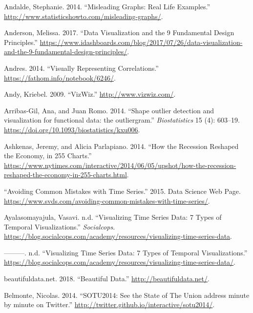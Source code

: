 \documentclass[]{book}
\begin{document}
\leavevmode\hypertarget{ref-andale_2014}{}%
Andalde, Stephanie. 2014. ``Misleading Graphs: Real Life Examples.'' \url{http://www.statisticshowto.com/misleading-graphs/}.

\leavevmode\hypertarget{ref-design_principles}{}%
Anderson, Melissa. 2017. ``Data Visualization and the 9 Fundamental Design Principles.'' \url{https://www.idashboards.com/blog/2017/07/26/data-visualization-and-the-9-fundamental-design-principles/}.

\leavevmode\hypertarget{ref-Visualizing_correlations}{}%
Andres. 2014. ``Visually Representing Correlations.'' \url{https://fathom.info/notebook/6246/}.

\leavevmode\hypertarget{ref-vizwiz}{}%
Andy, Kriebel. 2009. ``VizWiz.'' \url{http://www.vizwiz.com/}.

\leavevmode\hypertarget{ref-outliar}{}%
Arribas-Gil, Ana, and Juan Romo. 2014. ``Shape outlier detection and visualization for functional data: the outliergram.'' \emph{Biostatistics} 15 (4): 603--19. \url{https://doi.org/10.1093/biostatistics/kxu006}.

\leavevmode\hypertarget{ref-recession_economy}{}%
Ashkenas, Jeremy, and Alicia Parlapiano. 2014. ``How the Recession Reshaped the Economy, in 255 Charts.'' \url{https://www.nytimes.com/interactive/2014/06/05/upshot/how-the-recession-reshaped-the-economy-in-255-charts.html}.

\leavevmode\hypertarget{ref-TimeSeries}{}%
``Avoiding Common Mistakes with Time Series.'' 2015. Data Science Web Page. \url{https://www.svds.com/avoiding-common-mistakes-with-time-series/}.

\leavevmode\hypertarget{ref-aya-time-series}{}%
Ayalasomayajula, Vasavi. n.d. ``Visualizing Time Series Data: 7 Types of Temporal Visualizations.'' \emph{Socialcops}. \url{https://blog.socialcops.com/academy/resources/visualizing-time-series-data}.

\leavevmode\hypertarget{ref-socialcops}{}%
---------. n.d. ``Visualizing Time Series Data: 7 Types of Temporal Visualizations.'' \url{https://blog.socialcops.com/academy/resources/visualizing-time-series-data/}.

\leavevmode\hypertarget{ref-data_beaut}{}%
beautifuldata.net. 2018. ``Beautiful Data.'' \url{http://beautifuldata.net/}.

\leavevmode\hypertarget{ref-SotU2014}{}%
Belmonte, Nicolas. 2014. ``SOTU2014: See the State of The Union address minute by minute on Twitter.'' \url{http://twitter.github.io/interactive/sotu2014/}.
\end{document}
